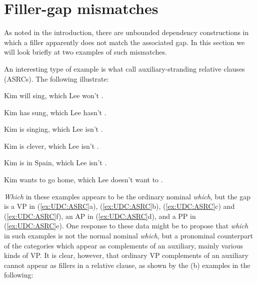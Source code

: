 \documentclass[output=paper
,notxmath 
	        ,collection
	        ,collectionchapter
 	        ,biblatex
                ,babelshorthands
                ,newtxmath
                ,draftmode
                ,colorlinks, citecolor=brown
]{langscibook}
\begin{document}


\section{Filler-gap mismatches}
\label{sec:UDC:FillerGapMismatches}

As noted in the introduction, there are unbounded dependency
constructions in which a filler apparently does not match the
associated gap. In this section we will look briefly at two examples
of such mismatches.

An interesting type of example is what \citet{Arnold:Borsley:10} call
auxiliary-stranding relative clauses (ASRCs). The following
illustrate:

\begin{exe}
  \ex \label{ex:UDC:ASRC}
  \begin{xlist}
    \ex Kim will sing, which Lee won't \trace{}.
    
    \ex Kim has sung, which Lee hasn't \trace{}.
    
    \ex Kim is singing, which Lee isn't \trace{}.
    
    \ex Kim is clever, which Lee isn't \trace{}.
    
    \ex Kim is in Spain, which Lee isn't \trace{}.
    
    \ex Kim wants to go home, which Lee doesn't want to \trace{}.
  \end{xlist}
\end{exe}

\noindent
\emph{Which} in these examples appears to be the ordinary nominal
\emph{which}, but the gap is a VP in (\ref{ex:UDC:ASRC}a), (\ref{ex:UDC:ASRC}b), (\ref{ex:UDC:ASRC}c) and (\ref{ex:UDC:ASRC}f), an AP in
(\ref{ex:UDC:ASRC}d), and a PP in (\ref{ex:UDC:ASRC}e). One response to these data might be to propose
that \emph{which} in such examples is not the normal nominal
\emph{which}, but a pronominal counterpart of the categories which appear
as complements of an auxiliary, mainly various kinds of VP. It is clear,
however, that ordinary VP complements of an auxiliary cannot appear as
fillers in a relative clause, as shown by the (b) examples in the
following:

\begin{exe} \ex \begin{xlist} 

\end{xlist}
\end{exe}
\end{document}

